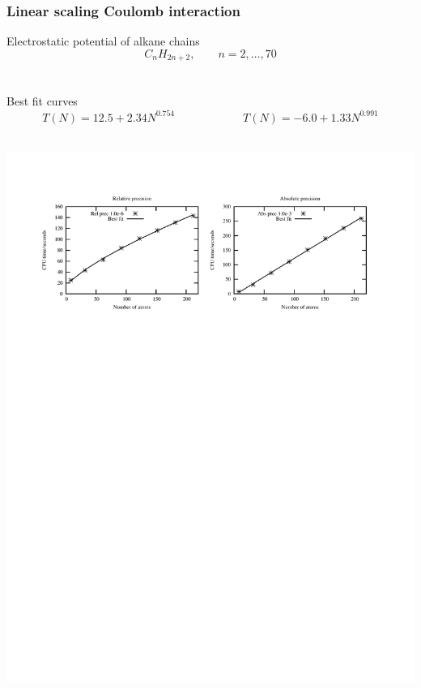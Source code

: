 \documentclass[mathserif]{beamer}
\begin{document}
\begin{frame}
    \frametitle{Linear scaling Coulomb interaction}
    Electrostatic potential of alkane chains \\
    \begin{equation}
	\nonumber
	C_{n}H_{2n+2}, \qquad n=2,\dots,70
    \end{equation}
    \ \\
    \ \\
    Best fit curves
    \begin{equation}
	\nonumber
	T(N) = 12.5 + 2.34N^{0.754} \qquad \qquad \qquad T(N) = -6.0 + 1.33N^{0.991}
    \end{equation}
    \ \\
    \begin{center}
	\includegraphics[scale=0.6, clip, viewport = 50 550 540 730]{figures/linearScaling.pdf}
    \end{center}
\end{frame}
\end{document}
